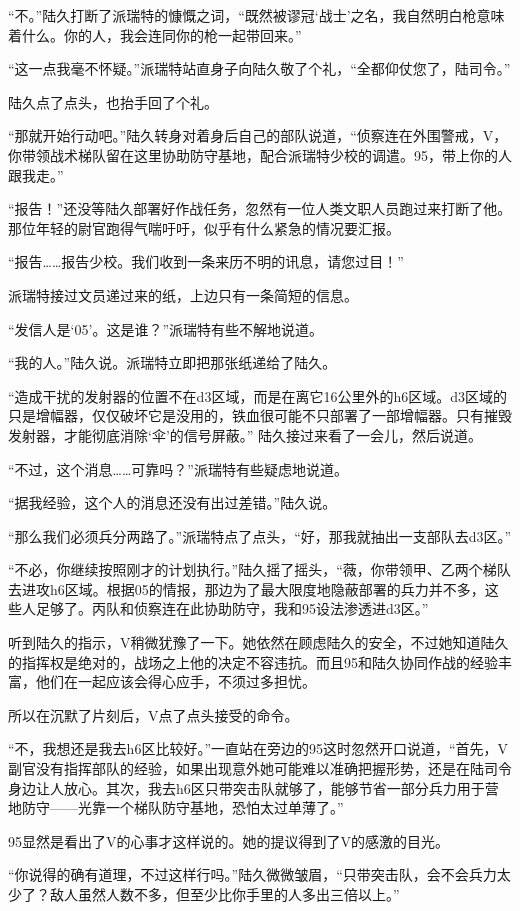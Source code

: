 “不。”陆久打断了派瑞特的慷慨之词，“既然被谬冠‘战士’之名，我自然明白枪意味着什么。你的人，我会连同你的枪一起带回来。”

“这一点我毫不怀疑。”派瑞特站直身子向陆久敬了个礼，“全都仰仗您了，陆司令。”

陆久点了点头，也抬手回了个礼。

“那就开始行动吧。”陆久转身对着身后自己的部队说道，“侦察连在外围警戒，V，你带领战术梯队留在这里协助防守基地，配合派瑞特少校的调遣。95，带上你的人跟我走。”

“报告！”还没等陆久部署好作战任务，忽然有一位人类文职人员跑过来打断了他。那位年轻的尉官跑得气喘吁吁，似乎有什么紧急的情况要汇报。

“报告……报告少校。我们收到一条来历不明的讯息，请您过目！”

派瑞特接过文员递过来的纸，上边只有一条简短的信息。

“发信人是‘05’。这是谁？”派瑞特有些不解地说道。

“我的人。”陆久说。派瑞特立即把那张纸递给了陆久。

“造成干扰的发射器的位置不在d3区域，而是在离它16公里外的h6区域。d3区域的只是增幅器，仅仅破坏它是没用的，铁血很可能不只部署了一部增幅器。只有摧毁发射器，才能彻底消除‘伞’的信号屏蔽。” 陆久接过来看了一会儿，然后说道。

“不过，这个消息……可靠吗？”派瑞特有些疑虑地说道。

“据我经验，这个人的消息还没有出过差错。”陆久说。

“那么我们必须兵分两路了。”派瑞特点了点头，“好，那我就抽出一支部队去d3区。”

“不必，你继续按照刚才的计划执行。”陆久摇了摇头，“薇，你带领甲、乙两个梯队去进攻h6区域。根据05的情报，那边为了最大限度地隐蔽部署的兵力并不多，这些人足够了。丙队和侦察连在此协助防守，我和95设法渗透进d3区。”

听到陆久的指示，V稍微犹豫了一下。她依然在顾虑陆久的安全，不过她知道陆久的指挥权是绝对的，战场之上他的决定不容违抗。而且95和陆久协同作战的经验丰富，他们在一起应该会得心应手，不须过多担忧。

所以在沉默了片刻后，V点了点头接受的命令。

“不，我想还是我去h6区比较好。”一直站在旁边的95这时忽然开口说道，“首先，V副官没有指挥部队的经验，如果出现意外她可能难以准确把握形势，还是在陆司令身边让人放心。其次，我去h6区只带突击队就够了，能够节省一部分兵力用于营地防守——光靠一个梯队防守基地，恐怕太过单薄了。”

95显然是看出了V的心事才这样说的。她的提议得到了V的感激的目光。

“你说得的确有道理，不过这样行吗。”陆久微微皱眉，“只带突击队，会不会兵力太少了？敌人虽然人数不多，但至少比你手里的人多出三倍以上。”

